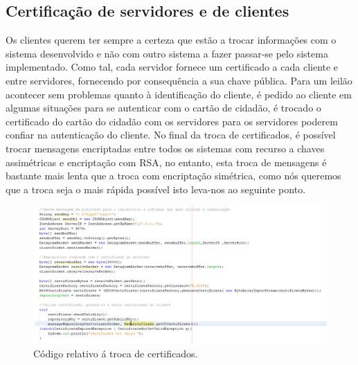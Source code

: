 \documentclass[pdftex,12pt,a4paper]{report}
\begin{document}
\subsection{Certificação de servidores e de clientes}
Os clientes querem ter sempre a certeza que estão a trocar informações com o sistema desenvolvido e não com outro sistema a fazer passar-se pelo sistema implementado. Como tal, cada servidor fornece um certificado a cada cliente e entre servidores, fornecendo por consequência a sua chave pública.
Para um leilão acontecer sem problemas quanto à identificação do cliente, é pedido ao cliente em algumas situações para se autenticar com o cartão de cidadão, é trocado o certificado do cartão do cidadão com os servidores para os servidores poderem confiar na autenticação do cliente.
No final da troca de certificados, é possível trocar mensagens encriptadas entre todos os sistemas com recurso a chaves assimétricas e encriptação com RSA, no entanto, esta troca de mensagens é bastante mais lenta que a troca com encriptação simétrica, como nós queremos que a troca seja o mais rápida possível isto leva-nos ao seguinte ponto.
\begin{figure}[h]
    \centering
    \includegraphics[width=17.0cm]{cert.png}
    \caption{Código relativo á troca de certificados.}
    \label{fig:mesh1}
\end{figure}

\newpage
\end{document}

